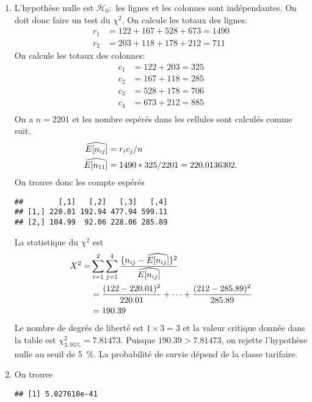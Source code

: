 \begin{solution}{6.12}
\begin{enumerate}
\item L'hypothèse nulle est $\mathcal{H}_0 :$ les lignes et les colonnes sont indépendantes. On doit donc faire un test du $\chi^2$. On calcule les totaux des lignes:
\begin{align*}
r_1 &= 122+167+528+673 = 1490\\
r_2 &= 203+118+178+212 = 711
\end{align*}
 On calcule les totaux des colonnes:
\begin{align*}
c_1 &= 122+203 = 325\\
c_2 &= 167+118 = 285\\
c_3 &= 528+178 = 706\\
c_4 &= 673+212 = 885\\
\end{align*}
On a $n=2201$ et les nombre espérés dans les cellules sont calculés comme suit.
\begin{align*}
\widehat{E [ n_{ij} ]} &= r_ic_j/n\\
\widehat{E [ n_{11} ]} &= 1490*325/2201= 220.0136302.
\end{align*}
On trouve donc les compte espérés
\begin{knitrout}
\color{fgcolor}\begin{kframe}
\begin{verbatim}
##        [,1]   [,2]   [,3]   [,4]
## [1,] 220.01 192.94 477.94 599.11
## [2,] 104.99  92.06 228.06 285.89
\end{verbatim}
\end{kframe}
\end{knitrout}
La statistique du $\chi^2$ est
\begin{align*}
X^2 =&\sum_{i=1}^2\sum_{j=1}^4 \frac{\{n_{ij}-\widehat{E [ n_{ij} ]}\}^2}{\widehat{E [ n_{ij} ]}}\\
& = \frac{(122-220.01)^2}{220.01}+\cdots+\frac{(212-285.89)^2}{285.89}\\
&= 190.39
\end{align*}
Le nombre de degrés de liberté est $1\times 3 = 3$ et la valeur critique donnée dans la table est $\chi^2_{3,95\%} = 7.81473$. Puisque $190.39>7.81473$, on rejette l'hypothèse nulle au seuil de 5~\%. La probabilité de survie dépend de la classe tarifaire.

\item On trouve
\begin{knitrout}
\color{fgcolor}\begin{kframe}
\begin{alltt}
\hlstd{(}\hlstd{,}\hlstd{,}\hlstd{=}\hlstd{)}
\end{alltt}
\begin{verbatim}
## [1] 5.027618e-41
\end{verbatim}
\end{kframe}
\end{knitrout}


\end{enumerate}
\end{solution}
